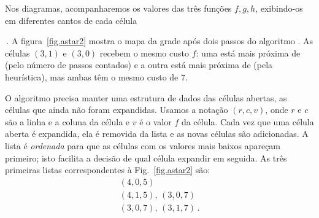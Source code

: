 
Nos diagramas, acompanharemos os valores das três funções $f,g,h$, exibindo-os em diferentes cantos de cada célula
\,.
A figura~\ref{fig.astar2} mostra o mapa da grade após dois passos do algoritmo \astar{}. As células $(3,1)$ e $(3,0)$ recebem o mesmo custo $f$: uma está mais próxima de  (pelo número de passos contados) e a outra está mais próxima de  (pela heurística), mas ambas têm o mesmo custo de $7$.

O algoritmo precisa manter uma estrutura de dados das células abertas, as células que ainda não foram expandidas. Usamos a notação $(r,c,v)$, onde $r$ e $c$ são a linha e a coluna da célula e $v$ é o valor $f$ da célula. Cada vez que uma célula aberta é expandida, ela é removida da lista e as novas células são adicionadas. A lista é \emph{ordenada} para que as células com os valores mais baixos apareçam primeiro; isto facilita a decisão de qual célula expandir em seguida. As três primeiras listas correspondentes à Fig.~\ref{fig.astar2} são:
\begin{displaymath}
\begin{array}{l}
(4,0,5)\\
(4,1,5),\,(3,0,7)\\
(3,0,7),\,(3,1,7)\,.
\end{array}
\end{displaymath}

